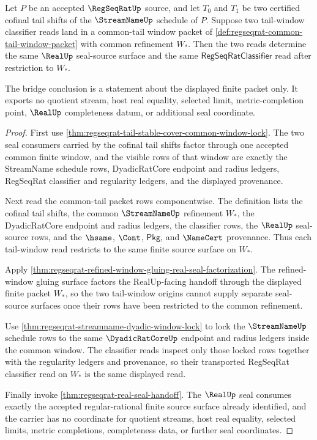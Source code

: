 \begin{theorem}
\label{thm:regseqrat-common-tail-window-classifier-bridge}
Let $P$ be an accepted $\RegSeqRatUp$ source, and let $T_0$ and $T_1$ be two certified cofinal tail shifts of the $\StreamNameUp$ schedule of $P$. Suppose two tail-window classifier reads land in a common-tail window packet of \autoref{def:regseqrat-common-tail-window-packet} with common refinement $W_\ast$. Then the two reads determine the same $\RealUp$ seal-source surface and the same $\mathsf{RegSeqRatClassifier}$ read after restriction to $W_\ast$.

The bridge conclusion is a statement about the displayed finite packet only. It exports no quotient stream, host real equality, selected limit, metric-completion point, $\RealUp$ completeness datum, or additional seal coordinate.
\end{theorem}
\begin{proof}
First use \autoref{thm:regseqrat-tail-stable-cover-common-window-lock}. The two seal consumers carried by the cofinal tail shifts factor through one accepted common finite window, and the visible rows of that window are exactly the StreamName schedule rows, DyadicRatCore endpoint and radius ledgers, RegSeqRat classifier and regularity ledgers, and the displayed provenance.

Next read the common-tail packet rows componentwise. The definition lists the cofinal tail shifts, the common $\StreamNameUp$ refinement $W_\ast$, the DyadicRatCore endpoint and radius ledgers, the classifier rows, the $\RealUp$ seal-source rows, and the $\hsame$, $\Cont$, $\mathsf{Pkg}$, and $\NameCert$ provenance. Thus each tail-window read restricts to the same finite source surface on $W_\ast$.

Apply \autoref{thm:regseqrat-refined-window-gluing-real-seal-factorization}. The refined-window gluing surface factors the RealUp-facing handoff through the displayed finite packet $W_\ast$, so the two tail-window origins cannot supply separate seal-source surfaces once their rows have been restricted to the common refinement.

Use \autoref{thm:regseqrat-streamname-dyadic-window-lock} to lock the $\StreamNameUp$ schedule rows to the same $\DyadicRatCoreUp$ endpoint and radius ledgers inside the common window. The classifier reads inspect only those locked rows together with the regularity ledgers and provenance, so their transported RegSeqRat classifier read on $W_\ast$ is the same displayed read.

Finally invoke \autoref{thm:regseqrat-real-seal-handoff}. The $\RealUp$ seal consumes exactly the accepted regular-rational finite source surface already identified, and the carrier has no coordinate for quotient streams, host real equality, selected limits, metric completions, completeness data, or further seal coordinates.
\end{proof}

